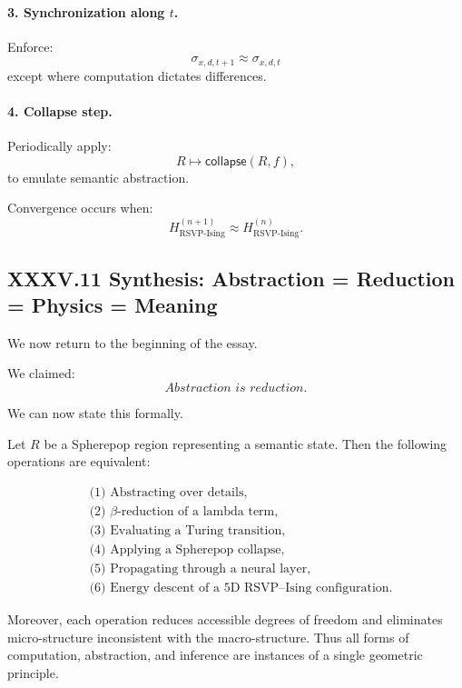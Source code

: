 \documentclass[12pt,letterpaper]{article}
\begin{document}
\paragraph{3. Synchronization along $t$.}
Enforce:
\[
\sigma_{x,d,t+1} \approx \sigma_{x,d,t}
\]
except where computation dictates differences.

\paragraph{4. Collapse step.}
Periodically apply:
\[
R \mapsto \mathsf{collapse}(R,f),
\]
to emulate semantic abstraction.

Convergence occurs when:
\[
H_{\text{RSVP-Ising}}^{(n+1)} \approx H_{\text{RSVP-Ising}}^{(n)}.
\]

\subsection{XXXV.11 Synthesis: Abstraction = Reduction = Physics = Meaning}

We now return to the beginning of the essay.

We claimed:
\[
\textit{Abstraction is reduction.}
\]

We can now state this formally.

\begin{theorem}
Let $R$ be a Spherepop region representing a semantic state.
Then the following operations are equivalent:

\[
\begin{aligned}
&\text{(1) Abstracting over details},\\
&\text{(2) $\beta$-reduction of a lambda term},\\
&\text{(3) Evaluating a Turing transition},\\
&\text{(4) Applying a Spherepop collapse},\\
&\text{(5) Propagating through a neural layer},\\
&\text{(6) Energy descent of a 5D RSVP--Ising configuration}.
\end{aligned}
\]

Moreover, each operation reduces accessible degrees of freedom 
and eliminates micro-structure inconsistent with the macro-structure.
Thus all forms of computation, abstraction, and inference
are instances of a single geometric principle.
\end{theorem}
\end{document}
